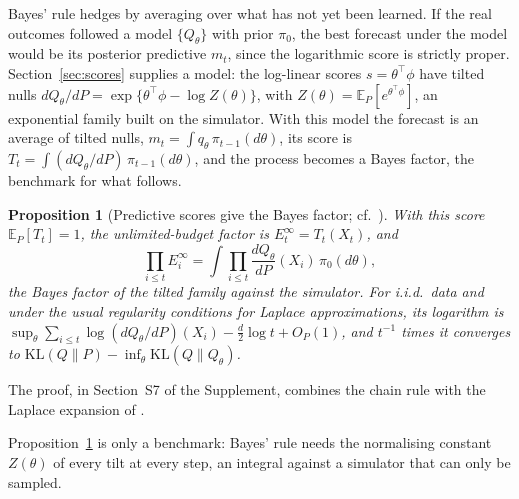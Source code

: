 \documentclass[12pt]{article}
\newcommand{\E}{\mathbb{E}}
\newcommand{\KL}{\mathrm{KL}}
\newtheorem{proposition}{Proposition}
\theoremstyle{remark}
\begin{document}
Bayes' rule hedges by averaging over what has not yet been learned. If the
real outcomes followed a model $\{Q_\theta\}$ with prior $\pi_0$, the best
forecast under the model would be its posterior predictive $m_t$, since the
logarithmic score is strictly proper. Section~\ref{sec:scores} supplies a
model: the log-linear scores $s = \theta^\top\phi$ have tilted nulls
$dQ_\theta/dP = \exp\{\theta^\top\phi - \log Z(\theta)\}$, with
$Z(\theta) = \E_P[e^{\theta^\top\phi}]$, an exponential family built on the
simulator. With this model the forecast is an average of tilted nulls,
$m_t = \int q_\theta\,\pi_{t-1}(d\theta)$, its score is
$T_t = \int (dQ_\theta/dP)\,\pi_{t-1}(d\theta)$, and the process becomes a
Bayes factor, the benchmark for what follows.

\begin{proposition}[Predictive scores give the Bayes factor; cf.\ \citealp{clarke1990information}]\label{prop:bayes}
With this score $\E_P[T_t] = 1$, the unlimited-budget factor is
$E_t^\infty = T_t(X_t)$, and
\[
\prod_{i\le t} E_i^\infty = \int \prod_{i \le t} \frac{dQ_\theta}{dP}(X_i)\,\pi_0(d\theta),
\]
the Bayes factor of the tilted family against the simulator. For i.i.d.\ data
and under the usual regularity conditions for Laplace approximations, its
logarithm is $\sup_\theta \sum_{i\le t}\log (dQ_\theta/dP)(X_i) - \frac{d}{2}\log t
+ O_P(1)$, and $t^{-1}$ times it converges to
$\KL(Q\|P) - \inf_\theta \KL(Q\|Q_\theta)$.
\end{proposition}

The proof, in Section~S7 of the Supplement, combines the chain rule with the
Laplace expansion of \citet{clarke1990information}.

Proposition~\ref{prop:bayes} is only a benchmark: Bayes' rule needs the
normalising constant $Z(\theta)$ of every tilt at every step, an integral
against a simulator that can only be sampled.
\end{document}
